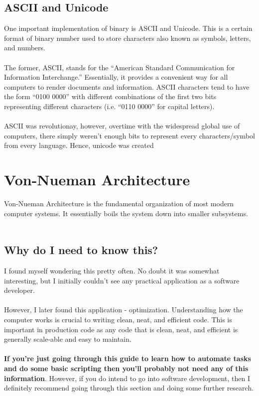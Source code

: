 \documentclass[12pt,a4paper]{book}
\begin{document}
			\subsection{ASCII and Unicode}
				One important implementation of binary is ASCII and Unicode. This is a certain format of binary number used to store characters also known as symbols, letters, and numbers. 
				\\\\
				The former, ASCII, stands for the ``American Standard Communication for Information Interchange.'' Essentially, it provides a convenient way for all computers to render documents and information. ASCII characters tend to have the form ``0100 0000'' with different combinations of the first two bits representing different characters (i.e. ``0110 0000'' for capital letters).
				\\\\
				ASCII was revolutionay, however, overtime with the widespread global use of computers, there simply weren't enough bits to represent every characters/symbol from every language. Hence, unicode was created 
		\section{Von-Nueman Architecture}
			Von-Nueman Architecture is the fundamental organization of most modern computer systems. It essentially boils the system down into smaller subsystems.
			\\\\
			\subsection{Why do I need to know this?}
				I found myself wondering this pretty often. No doubt it was somewhat interesting, but I initially couldn't  see any practical application as a software developer. 
				\\\\
				However, I later found this application - optimization. Understanding how the computer works is crucial to writing clean, neat, and efficient code. This is important in production code as any code that is clean, neat, and efficient is generally scale-able and easy to maintain.
				\\\\
				\textbf{If you're just going through this guide to learn how to automate tasks and do some basic scripting then you'll probably not need any of this information}. However, if you do intend to go into software development, then I definitely recommend going through this section and doing some further research.
\end{document}

